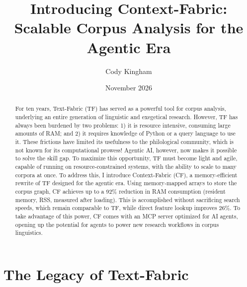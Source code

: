 \documentclass[11pt,a4paper]{article}
\title{Introducing Context-Fabric:\\[0.5em]
\large Scalable Corpus Analysis for the Agentic Era}
\author{Cody Kingham}
\date{November 2026}
\begin{document}
\maketitle

\begin{abstract}
For ten years, Text-Fabric (TF) has served as a powerful tool for corpus analysis, underlying 
an entire generation of linguistic and exegetical research. However, TF has always been burdened by two problems:
1) it is resource intensive, consuming large amounts of RAM; and 2) it requires knowledge of Python or
a query language to use it. These frictions have limited its usefulness to the philological community,
which is not known for its computational prowess!
Agentic AI, however, now makes it possible to solve the skill gap. To maximize this opportunity,
TF must become light and agile, capable of running on resource-constrained systems, with the ability to scale to many corpora at once.
To address this, I introduce Context-Fabric (CF), a memory-efficient rewrite of TF designed for the agentic era.
Using memory-mapped arrays to store the corpus graph, CF achieves up to a 92\% reduction in RAM consumption
(resident memory, RSS, measured after loading). This is accomplished without sacrificing search speeds,
which remain comparable to TF, while direct feature lookup improves 26\%. To take advantage of this power,
CF comes with an MCP server optimized for AI agents, opening up the potential for agents to power new research
workflows in corpus linguistics.
\end{abstract}

\section{The Legacy of Text-Fabric}
\end{document}

